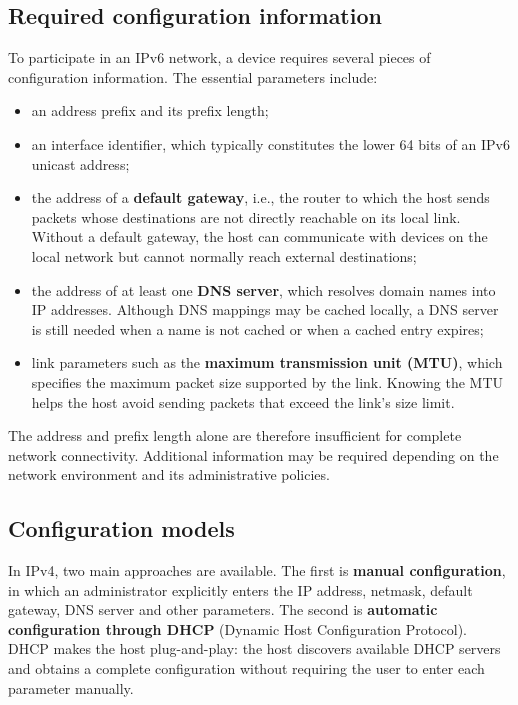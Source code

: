 \subsection{Required configuration information}

To participate in an IPv6 network, a device requires several pieces of
configuration information. The essential parameters include:

\begin{itemize}
	\item an address prefix and its prefix length;
	\item an interface identifier, which typically constitutes the lower
	64 bits of an IPv6 unicast address;
	\item the address of a \textbf{default gateway}, i.e., the router to which
	the host sends packets whose destinations are not directly reachable
	on its local link. Without a default gateway, the host can communicate
	with devices on the local network but cannot normally reach external
	destinations;
	\item the address of at least one \textbf{DNS server}, which resolves
	domain names into IP addresses. Although DNS mappings may be cached
	locally, a DNS server is still needed when a name is not cached or
	when a cached entry expires;
	\item link parameters such as the \textbf{maximum transmission unit
		(MTU)}, which specifies the maximum packet size supported by the link.
	Knowing the MTU helps the host avoid sending packets that exceed the
	link's size limit.
\end{itemize}

The address and prefix length alone are therefore insufficient for
complete network connectivity. Additional information may be required
depending on the network environment and its administrative policies.


\subsection{Configuration models}

In IPv4, two main approaches are available. The first is
\textbf{manual configuration}, in which an administrator explicitly
enters the IP address, netmask, default gateway, DNS server and other
parameters. The second is \textbf{automatic configuration through
	DHCP} (Dynamic Host Configuration Protocol). DHCP makes the host
plug-and-play: the host discovers available DHCP servers and obtains
a complete configuration without requiring the user to enter each
parameter manually.

